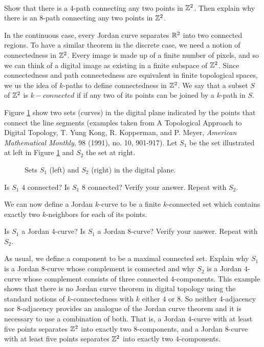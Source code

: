 \begin{activity} \label{act:digital_graph_theory} ~
\ba

\item Show that there is a $4$-path connecting any two points in $\mathbb{Z}^2$. Then explain why there is an $8$-path connecting any two points in $\mathbb{Z}^2$. 


\item In the continuous case, every Jordan curve separates $\mathbb{R}^2$ into two connected regions. To have a similar theorem in the discrete case, we need a notion of connectedness in $\mathbb{Z}^2$. Every image is made up of a finite number of pixels, and so we can think of a digital image as existing in a finite subspace of $\mathbb{Z}^2$. Since connectedness and path connectedness are equivalent in finite topological spaces, we us the idea of $k$-paths to define connectedness in $\mathbb{Z}^2$. We say that a subset $S$ of $\mathbb{Z}^2$ is $k-connected$ if if any two of its points can be joined by a $k$-path in $S$. 

Figure \ref{F:Digital_curves} show two sets (curves) in the digital plane indicated by the points that connect the line segments (examples taken from A Topological Approach to Digital Topology, T. Yung Kong,  R. Kopperman, and P. Meyer, \emph{American Mathematical Monthly}, 98 (1991), no. 10, 901-917). Let $S_1$ be the set illustrated at left in Figure \ref{F:Digital_curves} and $S_2$ the set at right. 
\begin{figure}[h]
\begin{center}
 \hspace{0.5in} 
\caption{Sets $S_1$ (left) and $S_2$ (right) in the digital plane.}
\label{F:Digital_curves}
\end{center}
\end{figure}

Is $S_1$ $4$ connected? Is $S_1$ $8$ connected? Verify your answer. Repeat with $S_2$. 

\item We can now define a Jordan $k$-curve to be a finite $k$-connected set which contains exactly two $k$-neighbors
for each of its points.

Is $S_1$ a Jordan $4$-curve? Is $S_1$ a Jordan $8$-curve? Verify your answer. Repeat with $S_2$. 

\item As usual, we define a component to be a maximal connected set. Explain why $S_1$ is a Jordan $8$-curve whose complement is connected and why $S_2$ is a Jordan $4$-curve whose complement consists of three connected $4$-components. This example shows that there is no Jordan curve theorem in digital topology using the standard notions of $k$-connectedness with $k$ either $4$ or $8$. So neither 4-adjacency nor 8-adjacency provides an analogue of the Jordan curve theorem and it is necessary to use a combination of both. That is, a Jordan $4$-curve with at least five points separates $\mathbb{Z}^2$ into exactly two $8$-components, and a Jordan $8$-curve with at least five points separates $\mathbb{Z}^2$ into exactly two $4$-components. 


\end{activity}
